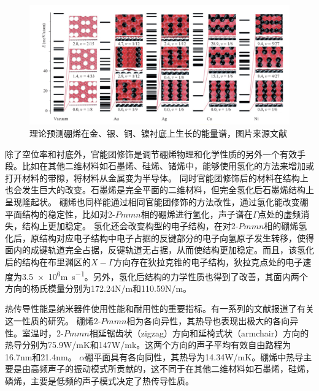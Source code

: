 \begin{figure}
  \includegraphics[width=1.06\textwidth]{figs/ch1_borophene_energy_spectra.png}
  \centering
  \caption{理论预测硼烯在金、银、铜、镍衬底上生长的能量谱，图片来源文献\cite{zhang2015two}}
  \label{fig:ch1_borophene_energy_spectra}
\end{figure}

除了空位率和衬底外，官能团修饰是调节硼烯物理和化学性质的另外一个有效手段。比如在其他二维材料如石墨烯、硅烯、锗烯中，能够使用氢化的方法来增加或打开材料的带隙，将材料从金属变为半导体\cite{balog2010bandgap,bhattacharya2011strain,houssa2011electronic}。
同时官能团修饰后的材料在结构上也会发生巨大的改变。石墨烯是完全平面的二维材料，但完全氢化后石墨烯结构上呈现隆起状。
硼烯也同样能通过相同官能团修饰的方法改性，通过氢化能改变硼平面结构的稳定性，比如对2-$Pmmn$相的硼烯进行氢化，声子谱在$\Gamma$点处的虚频消失，结构上更加稳定\cite{xu2016hydrogenated,wang2016high}。
氢化还会改变构型的电子结构\cite{xu2016hydrogenated}，在对2-$Pmmn$相的硼烯氢化后，原结构对应电子结构中电子占据的反键部分的电子向氢原子发生转移，使得面内的成键轨道完全占据，反键轨道无占据，从而使结构更加稳定。而且，该氢化后的结构在布里渊区的$X-\Gamma$方向存在狄拉克锥的电子结构，狄拉克点处的电子速度为\num{3.5e6}\si{\metre\per\second}\cite{xu2016hydrogenated}。另外，氢化后结构的力学性质也得到了改善，其面内两个方向的杨氏模量分别为172.24N/m和110.59N/m\cite{wang2016high}。

热传导性能是纳米器件使用性能和耐用性的重要指标。有一系列的文献\cite{li2018stretch,mortazavi2018borophene,zhou2017superior,liu2017anisotropic,sun2016first,mortazavi2017anomalous}报道了有关这一性质的研究。
硼烯2-$Pmmn$相为各向异性，其热导也表现出极大的各向异性。室温时，2-$Pmmn$相延锯齿状（zigzag）方向和延椅式状（armchair）方向的热导分别为75.9W/mK和147W/mk。这两个方向的声子平均有效自由路程为16.7nm和21.4nm。
$\alpha$硼平面具有各向同性，其热导为14.34W/mK。硼烯中热导主要是由高频声子的振动模式所贡献的，这不同于在其他二维材料如石墨烯，硅烯，磷烯，主要是低频的声子模式决定了热传导性质\cite{gu2015first,qin2015anisotropic}。

